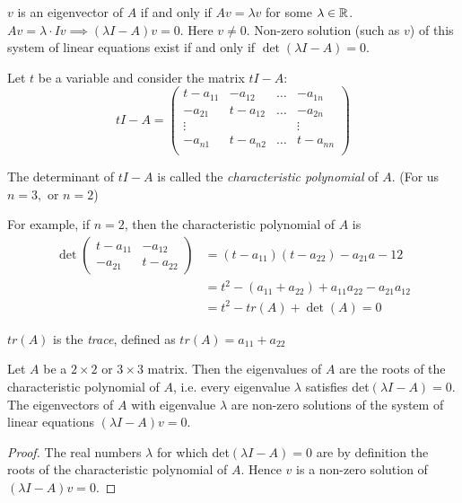 \documentclass[10pt]{scrartcl}
\begin{document}
 $v$ is an eigenvector of $A$ if and only if $Av = \lambda v$ for some $\lambda \in\mathbb{R}$. $Av = \lambda \cdot Iv \implies (\lambda I - A)v =0$. Here $v \neq 0$. Non-zero solution (such as $v$) of this system of linear equations exist if and only if $\det(\lambda I - A) = 0$. 
 
 Let $t$ be a variable and consider the matrix $tI - A$: 
 \[
  tI-A  = \begin{pmatrix}
 t-a_{11} & -a_{12} & \dots & -a_{1n}\\
 -a_{21} & t-a_{12} & \dots & -a_{2n}\\
 \vdots & & & \vdots\\
  -a_{n1} & t-a_{n2} & \dots & t-a_{nn}\\
 \end{pmatrix}
\]\vsp

\begin{definition} The determinant of $tI - A$ is called the \emph{characteristic polynomial} of $A$. (For us $n = 3,$ or $n=2$)\end{definition}
 For example, if $n = 2$, then the characteristic polynomial of $A$ is 
\begin{align*}
\det\begin{pmatrix}
t-a_{11} & -a_{12}\\ -a_{21} & t-a_{22}
\end{pmatrix} 
&= (t-a_{11})(t-a_{22}) - a_{21}a-{12}\\
&= t^2 - (a_{11}+a_{22})+a_{11}a_{22} - a_{21}a_{12}\\
&= t^2 - tr(A) + \det(A) = 0
\end{align*}

\begin{definition}$tr(A)$ is the \emph{trace}, defined as $tr(A) = a_{11} + a_{22}$	
\end{definition}


\begin{proposition} Let $A$ be a $2 \times 2$ or $3 \times 3$ matrix. Then the eigenvalues of $A$ are the roots of the characteristic polynomial of $A$, i.e. every eigenvalue $\lambda$ satisfies det$(\lambda I - A) = 0$. The eigenvectors of $A$ with eigenvalue $\lambda$ are non-zero solutions of the system of linear equations $(\lambda I - A)v = 0$.
\end{proposition}

\begin{proof}
The real numbers $\lambda$ for which det$(\lambda I - A) = 0$ are by definition the roots of the characteristic polynomial of $A$. Hence $v$ is a non-zero solution of $(\lambda I - A)v = 0$.	
\end{proof}\vsp
\end{document}

